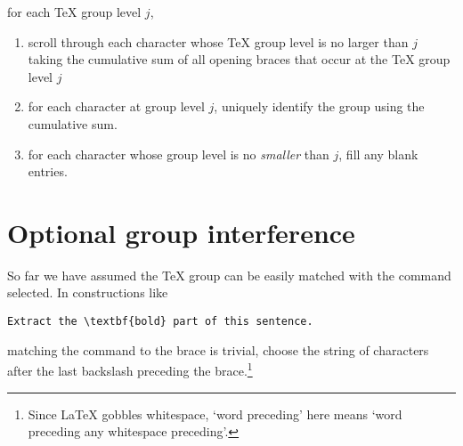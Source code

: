 \documentclass[b5paper]{scrartcl}\usepackage[]{graphicx}\usepackage[]{color}
\let\oldLaTeX\LaTeX
\renewcommand{\LaTeX}{\textrm{\oldLaTeX}}
\begin{document}
for each \TeX{} group level \(j\),
\begin{enumerate}
\item scroll through each character whose \TeX{} group level is no larger than \(j\) taking the cumulative sum of all opening braces that occur at the \TeX{} group level \(j\)
\item for each character at group level \(j\), uniquely identify the group using the cumulative sum.
\item for each character whose group level is no \emph{smaller} than \(j\), fill any blank entries.
\end{enumerate}

\section{Optional group interference}
So far we have assumed the \TeX{} group can be easily matched with the command selected.
In constructions like
\begin{lstlisting}
Extract the \textbf{bold} part of this sentence.
\end{lstlisting}
matching the command to the brace is trivial, choose the string of characters after the last backslash preceding the brace.\footnote{Since \LaTeX{} gobbles whitespace, `word preceding' here means `word preceding any whitespace preceding'.}
\end{document}
